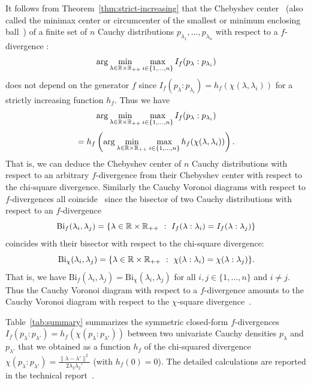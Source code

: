\documentclass[journal]{IEEEtran}
\begin{document}
It follows from  Theorem~\ref{thm:strict-increasing} that the Chebyshev center~\cite{ChebyshevAlphaDiv-2020} (also called the minimax center or circumcenter of the smallest or minimum enclosing ball~\cite{welzl1991smallest}) of a finite set of $n$ 
Cauchy distributions $p_{\lambda_1}, \ldots, p_{\lambda_n}$ with respect to a $f$-divergence :
$$
\arg\min_{\lambda\in{\mathbb{R}}\times {\mathbb{R}}_{++}} \max_{i\in\{1,\ldots,n\}} I_f(p_{\lambda}:p_{\lambda_i})
$$ 
does not depend on the generator $f$ since
$I_f(p_{\lambda}:p_{\lambda_i})=h_f\left(\chi(\lambda,\lambda_i)\right)$ for a strictly increasing function $h_f$.
Thus we have 
$$
\arg\min_{\lambda\in{\mathbb{R}}\times {\mathbb{R}}_{++}}\max_{i\in\{1,\ldots,n\}} I_f(p_{\lambda}:p_{\lambda_i})
$$
$$=h_f \left(\arg\min_{\lambda\in{\mathbb{R}}\times {\mathbb{R}}_{++}}\max_{i\in\{1,\ldots,n\}} h_f(\chi(\lambda,\lambda_i)) \right).
$$
That is, we can deduce the Chebyshev center of $n$ Cauchy distributions 
with respect to an arbitrary $f$-divergence from their Chebyshev center with respect to the chi-square divergence.
Similarly the Cauchy Voronoi diagrams with respect to $f$-divergences all coincide~\cite{CauchyVoronoi-2020} since the bisector of two Cauchy distributions with
respect to an $f$-divergence 
$$
\mathrm{Bi}_f(\lambda_i,\lambda_j)=\{\lambda\in \bbR\times \bbR_{++}\ :\ I_f(\lambda:\lambda_i)=I_f(\lambda:\lambda_j)\}
$$
coincides with their bisector with respect to the chi-square divergence:
$$
\mathrm{Bi}_\chi(\lambda_i,\lambda_j)=\{\lambda\in \bbR\times \bbR_{++}\ :\ \chi(\lambda:\lambda_i)=\chi(\lambda:\lambda_j)\}.
$$
That is, we have $\mathrm{Bi}_f(\lambda_i,\lambda_j)=\mathrm{Bi}_\chi(\lambda_i,\lambda_j)$ for all $i,j\in\{1,\ldots,n\}$ and $i\not=j$.
Thus the Cauchy Voronoi diagram with respect to a $f$-divergence amounts to the Cauchy Voronoi diagram with respect to the $\chi$-square divergence~\cite{CauchyVoronoi-2020}. 


Table~\ref{tab:summary} summarizes the symmetric closed-form $f$-divergences 
$I_f(p_{\lambda}:p_{\lambda'})=h_f(\chi(p_{\lambda}:p_{\lambda'}))$ 
 between two univariate Cauchy densities $p_{\lambda}$ and $p_{\lambda'}$
that we obtained as a function $h_f$ of the chi-squared divergence $\chi(p_{\lambda}:p_{\lambda'})=\frac{\|\lambda-\lambda'\|^2}{2\lambda_2\lambda_2'}$ (with $h_f(0)=0$).
The detailed calculations are reported in the technical report~\cite{Nielsen2021f}.
\end{document}
